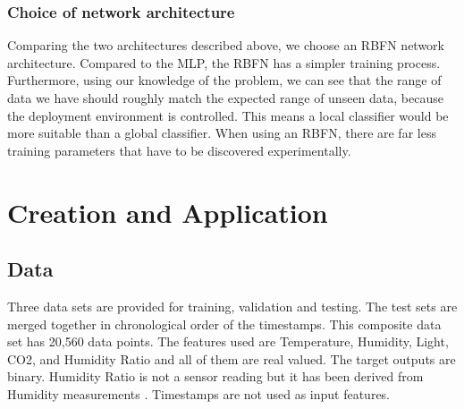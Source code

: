 \documentclass[a4paper, 11pt]{article}
\begin{document}

\subsubsection{Choice of network architecture}
Comparing the two architectures described above, we choose an RBFN network architecture. Compared to the MLP, the RBFN has a simpler training process. Furthermore, using our knowledge of the problem, we can see that the range of data we have should roughly match the expected range of unseen data, because the deployment environment is controlled. This means a local classifier would be more suitable than a global classifier.  When using an RBFN, there are far less training parameters that have to be discovered experimentally.

\section{Creation and Application}

\subsection{Data}
Three data sets are provided for training, validation and testing. The test sets are merged together in chronological order of the timestamps. This composite data set has 20,560 data points. The features used are Temperature, Humidity, Light, CO2, and Humidity Ratio and all of them are real valued. The target outputs are binary. Humidity Ratio is not a sensor reading but it has been derived from Humidity measurements \cite{Candanedo2016}. Timestamps are not used as input features.
\end{document}
